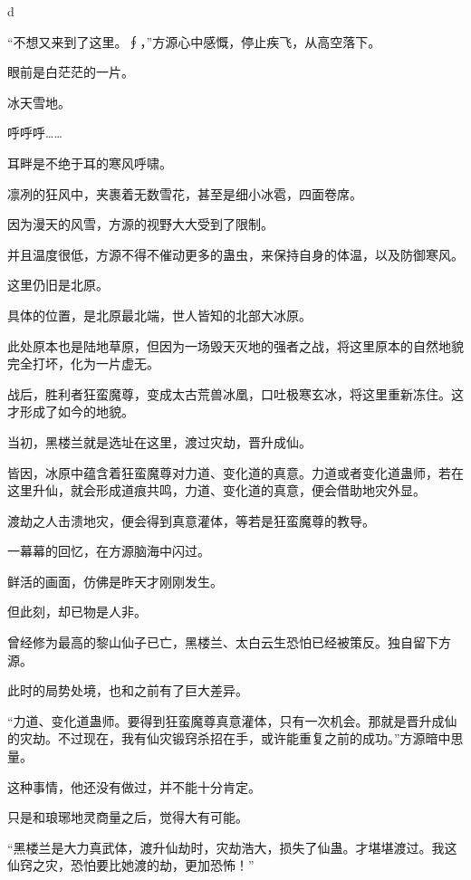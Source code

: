 
\begin{this_body}

d

“不想又来到了这里。∮，”方源心中感慨，停止疾飞，从高空落下。

眼前是白茫茫的一片。

冰天雪地。

呼呼呼……

耳畔是不绝于耳的寒风呼啸。

凛冽的狂风中，夹裹着无数雪花，甚至是细小冰雹，四面卷席。

因为漫天的风雪，方源的视野大大受到了限制。

并且温度很低，方源不得不催动更多的蛊虫，来保持自身的体温，以及防御寒风。

这里仍旧是北原。

具体的位置，是北原最北端，世人皆知的北部大冰原。

此处原本也是陆地草原，但因为一场毁天灭地的强者之战，将这里原本的自然地貌完全打坏，化为一片虚无。

战后，胜利者狂蛮魔尊，变成太古荒兽冰凰，口吐极寒玄冰，将这里重新冻住。这才形成了如今的地貌。

当初，黑楼兰就是选址在这里，渡过灾劫，晋升成仙。

皆因，冰原中蕴含着狂蛮魔尊对力道、变化道的真意。力道或者变化道蛊师，若在这里升仙，就会形成道痕共鸣，力道、变化道的真意，便会借助地灾外显。

渡劫之人击溃地灾，便会得到真意灌体，等若是狂蛮魔尊的教导。

一幕幕的回忆，在方源脑海中闪过。

鲜活的画面，仿佛是昨天才刚刚发生。

但此刻，却已物是人非。

曾经修为最高的黎山仙子已亡，黑楼兰、太白云生恐怕已经被策反。独自留下方源。

此时的局势处境，也和之前有了巨大差异。

“力道、变化道蛊师。要得到狂蛮魔尊真意灌体，只有一次机会。那就是晋升成仙的灾劫。不过现在，我有仙灾锻窍杀招在手，或许能重复之前的成功。”方源暗中思量。

这种事情，他还没有做过，并不能十分肯定。

只是和琅琊地灵商量之后，觉得大有可能。

“黑楼兰是大力真武体，渡升仙劫时，灾劫浩大，损失了仙蛊。才堪堪渡过。我这仙窍之灾，恐怕要比她渡的劫，更加恐怖！”


\end{this_body}
